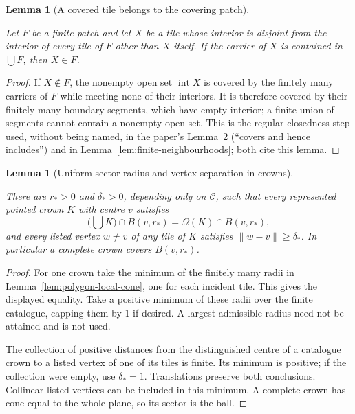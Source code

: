 \documentclass[11pt,a4paper]{article}
\newtheorem{lemma}[definition]{Lemma}
\theoremstyle{remark}
\newcommand{\lean}[1]{}
\newcommand{\uses}[1]{}
\begin{document}
\begin{lemma}[A covered tile belongs to the covering patch]
\label{lem:covered-tile-belongs}
\lean{Tilings.Patch.mem_of_carrier_subset_union}
\uses{def:polygon,def:placed}
Let $F$ be a finite patch and let $X$ be a tile whose interior is disjoint
from the interior of every tile of $F$ other than $X$ itself. If the
carrier of $X$ is contained in $\bigcup F$, then $X\in F$.
\end{lemma}
\begin{proof}
If $X\notin F$, the nonempty open set $\operatorname{int}X$ is covered by
the finitely many carriers of $F$ while meeting none of their interiors.
It is therefore covered by their finitely many boundary segments, which
have empty interior; a finite union of segments cannot contain a nonempty
open set. This is the regular-closedness step used, without being named,
in the paper's Lemma~2 (``covers and hence includes'') and in
Lemma~\ref{lem:finite-neighbourhoods}; both cite this lemma.
\end{proof}

\begin{lemma}[Uniform sector radius and vertex separation in crowns]
\label{lem:sector-radius}
\lean{Tilings.Crowns.uniformSectorRadius}
\uses{def:crown-sector,lem:polygon-local-cone}
There are $r_*>0$ and $\delta_*>0$, depending only on $\mathcal C$, such that
every represented pointed crown $K$ with centre $v$ satisfies
\[
  \bigl(\bigcup K\bigr)\cap B(v,r_*)
       =\Omega(K)\cap B(v,r_*),
\]
and every listed vertex $w\ne v$ of any tile of $K$ satisfies
$\lVert w-v\rVert\ge\delta_*$.  In particular a complete crown covers
$B(v,r_*)$.
\end{lemma}
\begin{proof}
For one crown take the minimum of the finitely many radii in
Lemma~\ref{lem:polygon-local-cone}, one for each incident tile.  This gives
the displayed equality.  Take a positive minimum of these radii over the
finite catalogue, capping them by $1$ if desired.  A largest admissible
radius need not be attained and is not used.

The collection of positive distances from the distinguished centre of a
catalogue crown to a listed vertex of one of its tiles is finite.  Its
minimum is positive; if the collection were empty, use $\delta_*=1$.
Translations preserve both conclusions.  Collinear listed vertices can be
included in this minimum.  A complete crown has cone equal to the whole
plane, so its sector is the ball.
\end{proof}
\end{document}

